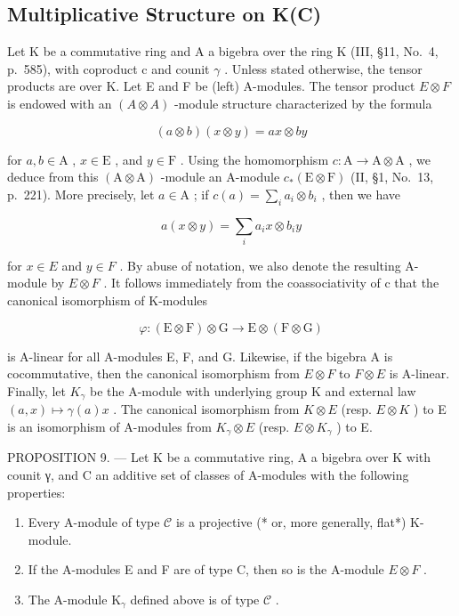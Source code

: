 \subsection{Multiplicative Structure on K(C)}

Let K be a commutative ring and A a bigebra over the ring K (III, §11, No.~4, p.~585), with coproduct c and counit \(\gamma\) . Unless stated otherwise, the tensor products are over K. Let E and F be (left) A-modules. The tensor product \(E \otimes F\) is endowed with an \((A \otimes A)\) -module structure characterized by the formula

\[
(a \otimes b) (x \otimes y) = a x \otimes b y\tag{11}
\]

for \(a, b \in \mathrm{A}\) , \(x \in \mathrm{E}\) , and \(y \in \mathrm{F}\) . Using the homomorphism \(c: \mathrm{A} \to \mathrm{A} \otimes \mathrm{A}\) , we deduce from this \((\mathrm{A} \otimes \mathrm{A})\) -module an A-module \(c_*(\mathrm{E} \otimes \mathrm{F})\) (II, §1, No.~13, p.~221). More precisely, let \(a \in \mathrm{A}\) ; if \(c(a) = \sum_{i} a_{i} \otimes b_{i}\) , then we have

\[
a (x \otimes y) = \sum_ {i} a _ {i} x \otimes b _ {i} y\tag{12}
\]

for \(x \in E\) and \(y \in F\) . By abuse of notation, we also denote the resulting A-module by \(E \otimes F\) . It follows immediately from the coassociativity of c that the canonical isomorphism of K-modules

\[
\varphi : (\mathrm{E} \otimes \mathrm{F}) \otimes \mathrm{G} \longrightarrow \mathrm{E} \otimes (\mathrm{F} \otimes \mathrm{G})
\]

is A-linear for all A-modules E, F, and G. Likewise, if the bigebra A is cocommutative, then the canonical isomorphism from \(E \otimes F\) to \(F \otimes E\) is A-linear. Finally, let \(K_{\gamma}\) be the A-module with underlying group K and external law \((a, x) \mapsto \gamma(a)x\) . The canonical isomorphism from \(K \otimes E\) (resp. \(E \otimes K\) ) to E is an isomorphism of A-modules from \(K_{\gamma} \otimes E\) (resp. \(E \otimes K_{\gamma}\) ) to E.

PROPOSITION 9. --- Let K be a commutative ring, A a bigebra over K with counit γ, and C an additive set of classes of A-modules with the following properties:

\begin{enumerate}
\def\labelenumi{(\roman{enumi})}
\item
  Every A-module of type \(\mathcal{C}\) is a projective (* or, more generally, flat*) K-module.
\item
  If the A-modules E and F are of type C, then so is the A-module \(E \otimes F\) .
\item
  The A-module \(\mathrm{K}_{\gamma}\) defined above is of type \(\mathcal{C}\) .
\end{enumerate}

